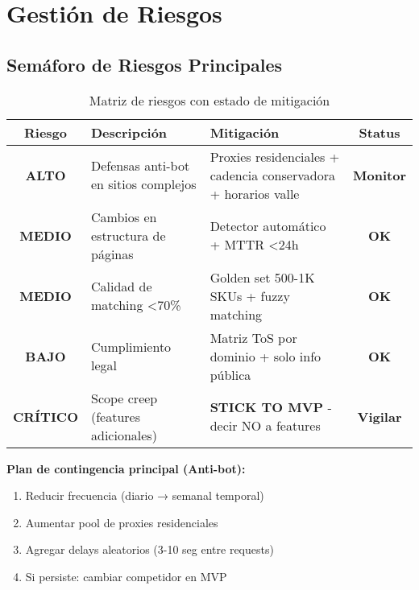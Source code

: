\documentclass[12pt,a4paper]{article}
\begin{document}
\newpage
\section{Gestión de Riesgos}

\subsection{Semáforo de Riesgos Principales}

\begin{table}[h]
\centering
\small
\begin{tabularx}{\textwidth}{|c|X|X|c|}
\hline
\rowcolor{lightgray}
\textbf{Riesgo} & \textbf{Descripción} & \textbf{Mitigación} & \textbf{Status} \\
\hline
\cellcolor{dangerred!30}\textbf{ALTO} & Defensas anti-bot en sitios complejos & Proxies residenciales + cadencia conservadora + horarios valle & \textcolor{warningyellow}{\textbf{Monitor}} \\
\hline
\cellcolor{warningyellow!30}\textbf{MEDIO} & Cambios en estructura de páginas & Detector automático + MTTR <24h & \textcolor{successgreen}{\textbf{OK}} \\
\hline
\cellcolor{warningyellow!30}\textbf{MEDIO} & Calidad de matching <70\% & Golden set 500-1K SKUs + fuzzy matching & \textcolor{successgreen}{\textbf{OK}} \\
\hline
\cellcolor{successgreen!30}\textbf{BAJO} & Cumplimiento legal & Matriz ToS por dominio + solo info pública & \textcolor{successgreen}{\textbf{OK}} \\
\hline
\cellcolor{dangerred!30}\textbf{CRÍTICO} & Scope creep (features adicionales) & \textbf{STICK TO MVP} - decir NO a features & \textcolor{dangerred}{\textbf{Vigilar}} \\
\hline
\end{tabularx}
\caption{Matriz de riesgos con estado de mitigación}
\end{table}

\textbf{Plan de contingencia principal (Anti-bot):}
\begin{enumerate}[leftmargin=*]
    \item Reducir frecuencia (diario → semanal temporal)
    \item Aumentar pool de proxies residenciales
    \item Agregar delays aleatorios (3-10 seg entre requests)
    \item Si persiste: cambiar competidor en MVP
\end{enumerate}
\end{document}
